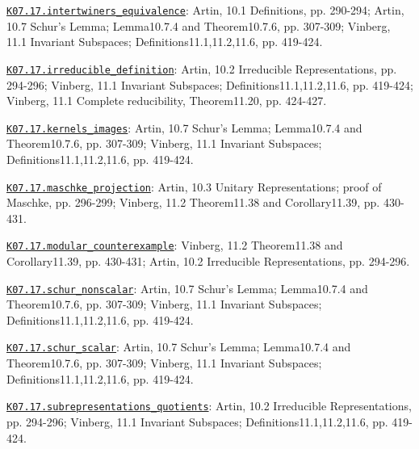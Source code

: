 \par\smallskip\noindent\hypertarget{src:K07.17.intertwiners_equivalence}{}\label{src:K07.17.intertwiners_equivalence}\hyperref[K07.17.intertwiners_equivalence]{\texttt{K07.17.intertwiners\_equivalence}}: Artin, 10.1 Definitions, pp. 290-294; Artin, 10.7 Schur's Lemma; Lemma10.7.4 and Theorem10.7.6, pp. 307-309; Vinberg, 11.1 Invariant Subspaces; Definitions11.1,11.2,11.6, pp. 419-424.
\par\smallskip\noindent\hypertarget{src:K07.17.irreducible_definition}{}\label{src:K07.17.irreducible_definition}\hyperref[K07.17.irreducible_definition]{\texttt{K07.17.irreducible\_definition}}: Artin, 10.2 Irreducible Representations, pp. 294-296; Vinberg, 11.1 Invariant Subspaces; Definitions11.1,11.2,11.6, pp. 419-424; Vinberg, 11.1 Complete reducibility, Theorem11.20, pp. 424-427.
\par\smallskip\noindent\hypertarget{src:K07.17.kernels_images}{}\label{src:K07.17.kernels_images}\hyperref[K07.17.kernels_images]{\texttt{K07.17.kernels\_images}}: Artin, 10.7 Schur's Lemma; Lemma10.7.4 and Theorem10.7.6, pp. 307-309; Vinberg, 11.1 Invariant Subspaces; Definitions11.1,11.2,11.6, pp. 419-424.
\par\smallskip\noindent\hypertarget{src:K07.17.maschke_projection}{}\label{src:K07.17.maschke_projection}\hyperref[K07.17.maschke_projection]{\texttt{K07.17.maschke\_projection}}: Artin, 10.3 Unitary Representations; proof of Maschke, pp. 296-299; Vinberg, 11.2 Theorem11.38 and Corollary11.39, pp. 430-431.
\par\smallskip\noindent\hypertarget{src:K07.17.modular_counterexample}{}\label{src:K07.17.modular_counterexample}\hyperref[K07.17.modular_counterexample]{\texttt{K07.17.modular\_counterexample}}: Vinberg, 11.2 Theorem11.38 and Corollary11.39, pp. 430-431; Artin, 10.2 Irreducible Representations, pp. 294-296.
\par\smallskip\noindent\hypertarget{src:K07.17.schur_nonscalar}{}\label{src:K07.17.schur_nonscalar}\hyperref[K07.17.schur_nonscalar]{\texttt{K07.17.schur\_nonscalar}}: Artin, 10.7 Schur's Lemma; Lemma10.7.4 and Theorem10.7.6, pp. 307-309; Vinberg, 11.1 Invariant Subspaces; Definitions11.1,11.2,11.6, pp. 419-424.
\par\smallskip\noindent\hypertarget{src:K07.17.schur_scalar}{}\label{src:K07.17.schur_scalar}\hyperref[K07.17.schur_scalar]{\texttt{K07.17.schur\_scalar}}: Artin, 10.7 Schur's Lemma; Lemma10.7.4 and Theorem10.7.6, pp. 307-309; Vinberg, 11.1 Invariant Subspaces; Definitions11.1,11.2,11.6, pp. 419-424.
\par\smallskip\noindent\hypertarget{src:K07.17.subrepresentations_quotients}{}\label{src:K07.17.subrepresentations_quotients}\hyperref[K07.17.subrepresentations_quotients]{\texttt{K07.17.subrepresentations\_quotients}}: Artin, 10.2 Irreducible Representations, pp. 294-296; Vinberg, 11.1 Invariant Subspaces; Definitions11.1,11.2,11.6, pp. 419-424.
